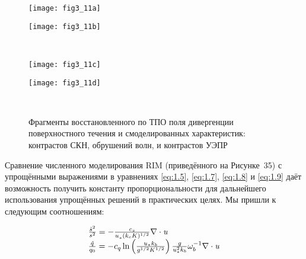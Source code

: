 {\begin{figure}[H]
   	\centering
	\begin{minipage}{.47\textwidth}
	    \subcaptionbox{\label{fig:3.11a}}
		{\texttt{[image: fig3\_11a]}}
	\end{minipage}
	\hfill
	\begin{minipage}{.47\textwidth}
	    \subcaptionbox{\label{fig:3.11b}}
		{\texttt{[image: fig3\_11b]}}
	\end{minipage}
	\\
	\begin{minipage}{.47\textwidth}
	    \subcaptionbox{\label{fig:3.11c}}
		{\texttt{[image: fig3\_11c]}}
	\end{minipage}
	\hfill
	\begin{minipage}{.47\textwidth}
	    \subcaptionbox{\label{fig:3.11d}}
		{\texttt{[image: fig3\_11d]}}
	\end{minipage}
    \\
    \caption{Фрагменты восстановленного по ТПО поля дивергенции поверхностного течения и смоделированных характеристик: контрастов СКН, обрушений волн, и контрастов УЭПР}
    \label{fig:3.11}
\end{figure}


Сравнение численного моделирования RIM (приведённого на Рисунке~35) с упрощёнными выражениями в уравнениях \eqref{eq:1.5}, \eqref{eq:1.7}, \eqref{eq:1.8} и \eqref{eq:1.9} даёт возможность получить константу пропорциональности для дальнейшего использования упрощённых решений в практических целях. Мы пришли к следующим соотношениям:



\begin{equation} \label{eq:3.11)} \begin{array}{l} {\frac{\tilde{s}^{2} }{s^{2} } =-\frac{c_{s} }{u_{*}^{} (k_{c} K)^{1/2} } \nabla \cdot {\it u}} \\ {\frac{\tilde{q}_{} }{q_{0} } =-c_{q} \ln \left(\frac{u_{*} k_{b} }{g^{1/2} K^{1/2} } \right)\frac{g}{u_{*}^{2} k_{b} } \omega _{b}^{-1} \nabla \cdot {\it u}} \end{array} \end{equation} 



}
